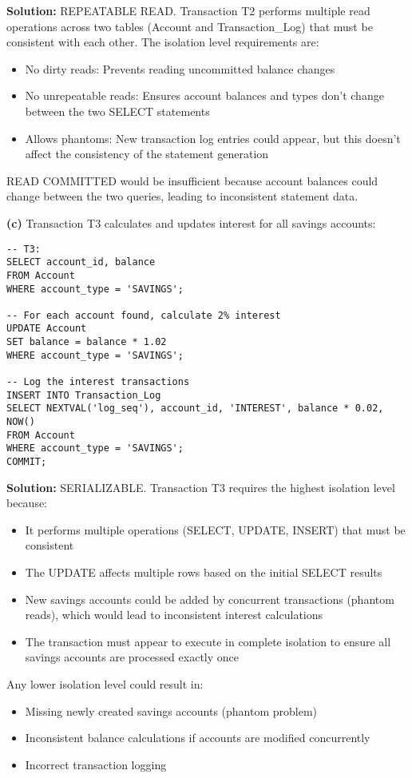 \documentclass{article}
\begin{document}
\textbf{Solution:}
REPEATABLE READ. Transaction T2 performs multiple read operations across two tables (Account and Transaction\_Log) that must be consistent with each other. The isolation level requirements are:
\begin{itemize}
    \item No dirty reads: Prevents reading uncommitted balance changes
    \item No unrepeatable reads: Ensures account balances and types don't change between the two SELECT statements
    \item Allows phantoms: New transaction log entries could appear, but this doesn't affect the consistency of the statement generation
\end{itemize}
READ COMMITTED would be insufficient because account balances could change between the two queries, leading to inconsistent statement data.

\textbf{(c)} Transaction T3 calculates and updates interest for all savings accounts:
\begin{verbatim}
-- T3:
SELECT account_id, balance 
FROM Account 
WHERE account_type = 'SAVINGS';

-- For each account found, calculate 2% interest
UPDATE Account 
SET balance = balance * 1.02 
WHERE account_type = 'SAVINGS';

-- Log the interest transactions
INSERT INTO Transaction_Log 
SELECT NEXTVAL('log_seq'), account_id, 'INTEREST', balance * 0.02, NOW()
FROM Account 
WHERE account_type = 'SAVINGS';
COMMIT;
\end{verbatim}

\textbf{Solution:}
SERIALIZABLE. Transaction T3 requires the highest isolation level because:
\begin{itemize}
    \item It performs multiple operations (SELECT, UPDATE, INSERT) that must be consistent
    \item The UPDATE affects multiple rows based on the initial SELECT results
    \item New savings accounts could be added by concurrent transactions (phantom reads), which would lead to inconsistent interest calculations
    \item The transaction must appear to execute in complete isolation to ensure all savings accounts are processed exactly once
\end{itemize}
Any lower isolation level could result in:
\begin{itemize}
    \item Missing newly created savings accounts (phantom problem)
    \item Inconsistent balance calculations if accounts are modified concurrently
    \item Incorrect transaction logging
\end{itemize}
\end{document}
